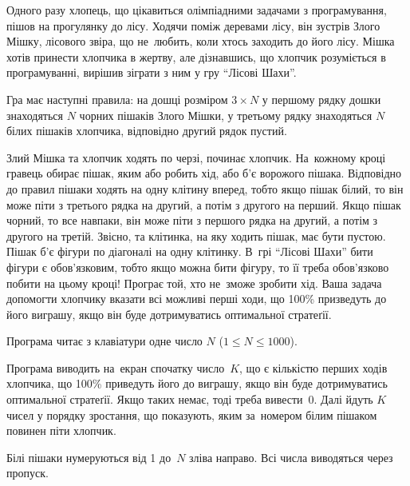﻿Одного разу хлопець, що цікавиться олімпіадними задачами з програмування, пішов
на прогулянку до лісу. Ходячи поміж деревами лісу, він зустрів Злого Мішку, лісового
звіра, що не~любить, коли хтось заходить до його лісу. Мішка хотів принести хлопчика
в жертву, але дізнавшись, що хлопчик розуміється в програмуванні, вирішив зіграти з
ним у гру ``Лісові Шахи''.

Гра має наступні правила: на дошці розміром $3\times N$ у першому рядку дошки
знаходяться $N$ чорних пішаків Злого Мішки, у третьому рядку знаходяться $N$ білих
пішаків хлопчика, відповідно другий рядок пустий.

Злий Мішка та хлопчик ходять по черзі, починає хлопчик. На~кожному кроці гравець
обирає пішак, яким або робить хід, або б'є ворожого пішака. Відповідно до правил
пішаки ходять на одну клітину вперед, тобто якщо пішак білий, то він може піти з
третього рядка на другий, а потім з другого на перший. Якщо пішак чорний, то все
навпаки, він може піти з першого рядка на другий, а потім з другого на третій. Звісно,
та клітинка, на яку ходить пішак, має бути пустою. Пішак б'є фігури по діагоналі на
одну клітинку. В~грі ``Лісові Шахи'' бити фігури є обов'язковим, тобто якщо можна бити
фігуру, то її треба обов'язково побити на цьому кроці! Програє той, хто не~зможе
зробити хід. Ваша задача допомогти хлопчику вказати всі можливі перші ходи, що
100\% призведуть до його виграшу, якщо він буде дотримуватись оптимальної
стратеґії.

\InputFile
Програма читає з клавіатури одне число $N$ ($1\leqslant N\leqslant 1000$).

\OutputFile
Програма виводить на~екран спочатку число~$K$, що є кількістю перших ходів хлопчика,
що 100\% приведуть його до виграшу, якщо він буде дотримуватись оптимальної
стратеґії. Якщо таких немає, тоді треба вивести~0. Далі йдуть $K$ чисел у порядку
зростання, що показують, яким за~номером білим пішаком повинен піти хлопчик.

Білі пішаки нумеруються від 1 до~$N$ зліва направо. Всі числа виводяться через
пропуск.


\Examples
\begin{example}
\end{example}

